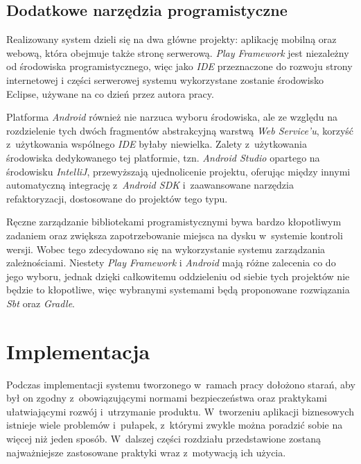 \documentclass[11pt]{aghdpl}
\begin{document}
\section{Dodatkowe narzędzia programistyczne}

Realizowany system dzieli się na dwa główne projekty: aplikację mobilną oraz webową, która obejmuje także stronę serwerową. \emph{Play Framework} jest niezależny od środowiska programistycznego, więc jako \emph{IDE} przeznaczone do rozwoju strony internetowej i części serwerowej systemu wykorzystane zostanie środowisko Eclipse, używane na co dzień przez autora pracy.

Platforma \emph{Android} również nie narzuca wyboru środowiska, ale ze względu na rozdzielenie tych dwóch fragmentów abstrakcyjną warstwą \emph{Web Service'u}, korzyść z~użytkowania wspólnego \emph{IDE} byłaby niewielka. Zalety z~użytkowania środowiska dedykowanego tej platformie, tzn. \emph{Android Studio} opartego na środowisku \emph{IntelliJ}, przewyższają ujednolicenie projektu, oferując między innymi automatyczną integrację z~\emph{Android SDK} i~zaawansowane narzędzia refaktoryzacji, dostosowane do projektów tego typu.

Ręczne zarządzanie bibliotekami programistycznymi bywa bardzo kłopotliwym zadaniem oraz zwiększa zapotrzebowanie miejsca na dysku w~systemie kontroli wersji. Wobec tego zdecydowano się na wykorzystanie systemu zarządzania zależnościami. Niestety \emph{Play Framework} i \emph{Android} mają różne zalecenia co do jego wyboru, jednak dzięki całkowitemu oddzieleniu od siebie tych projektów nie będzie to kłopotliwe, więc wybranymi systemami będą proponowane rozwiązania \emph{Sbt} oraz \emph{Gradle}.


\chapter{Implementacja}
\label{cha:implementacja}

Podczas implementacji systemu tworzonego w~ramach pracy dołożono starań, aby był on zgodny z~obowiązującymi normami bezpieczeństwa oraz praktykami ułatwiającymi rozwój i~utrzymanie produktu. W~tworzeniu aplikacji biznesowych istnieje wiele problemów i~pułapek, z~którymi zwykle można poradzić sobie na więcej niż jeden sposób. W~dalszej części rozdziału przedstawione zostaną najważniejsze zastosowane praktyki wraz z~motywacją ich użycia.
\end{document}
